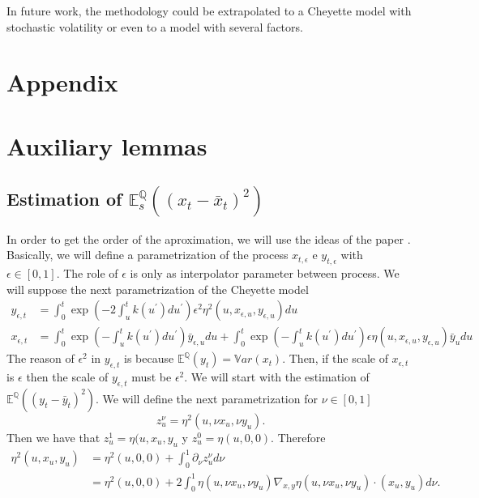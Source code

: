\documentclass[a4paper,10pt]{article}
\newcommand{\1}{\mathbf{1}}
\begin{document}
In future work, the methodology could be extrapolated to a Cheyette model with stochastic volatility or even to a model with several factors.


\section*{Appendix}
\appendix
\renewcommand{\thesection}{\Alph{section}.\arabic{section}}




\section{Auxiliary lemmas}
\subsection{Estimation of $\mathbb{E}_s^{\mathbb{Q}}\left((x_t - \bar{x}_{t})^{2}\right)$}\label{estimation_error_l2}
In order to get the order of the aproximation, we will use the ideas of the paper \cite{B-G-M-2008}. Basically, we will define a parametrization of the process $x_{t,\epsilon}$ e $y_{t,\epsilon}$ with $\epsilon \in [0,1]$. The role of $\epsilon$ is only as interpolator parameter between process. We will suppose the next parametrization of the Cheyette model
\begin{align}\label{parametric_process}
y_{\epsilon,t} &= \int_{0}^{t} \exp\left(-2 \int_{u}^{t} k(u^{\prime}) du^{\prime}\right) \epsilon^{2} \eta^{2}(u,x_{\epsilon,u},y_{\epsilon,u}) du \\
x_{\epsilon, t} &= \int_{0}^{t} \exp\left(-\int_{u}^{t} k(u^{\prime}) du^{\prime}\right) \bar{y}_{\epsilon,u} du + \int_{0}^{t} \exp\left(-\int_{u}^{t} k(u^{\prime}) du^{\prime}\right) \epsilon \eta(u,x_{\epsilon,u},y_{\epsilon,u})  \bar{y}_u du
\end{align}
The reason of $\epsilon^{2}$ in $y_{\epsilon,t}$ is because $\mathbb{E}^{\mathbb{Q}}\left(y_t\right)= \mathbb{V}ar(x_t)$. Then, if the scale of $x_{\epsilon,t}$ is $\epsilon$ then the scale of $y_{\epsilon,t}$ must be $\epsilon^{2}$. We will start with the estimation of $\mathbb{E}^{\mathbb{Q}}((y_t - \bar{y}_t)^{2})$. We will define the next parametrization for $\nu \in [0,1]$
\begin{equation*}
z^{\nu}_{u} = \eta^{2}(u, \nu x_u, \nu y_u).
\end{equation*}
Then we have that $z^{1}_{u} = \eta(u,x_u,y_u$ y $z^{0}_{u} = \eta(u,0,0)$. Therefore
\begin{align*}
\eta^{2}(u, x_u, y_u) &= \eta^{2}(u, 0, 0) + \int_{0}^{1} \partial_{\nu}z^{\nu}_{u} d\nu \\ 
&=  \eta^{2}(u, 0, 0) + 2 \int_{0}^{1} \eta(u, \nu x_u, \nu y_u)   \nabla_{x,y}\eta(u, \nu x_u, \nu y_u) \cdot (x_u, y_u) d\nu.
\end{align*}
\end{document}
